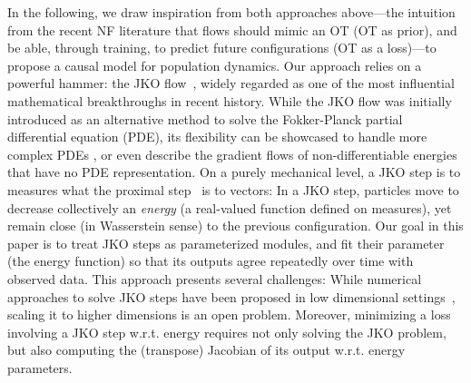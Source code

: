 In the following, we draw inspiration from both approaches above---the intuition from the recent \acrfull{NF} literature that flows should mimic an \acrlong{OT} (\acrshort{OT} as prior), and be able, through training, to predict future configurations (\acrshort{OT} as a loss)---to propose a causal model for population dynamics. Our approach relies on a powerful hammer: the \acrfull{JKO} flow~\citep{jordan1998variational}, widely regarded as one of the most influential mathematical breakthroughs in recent history. While the \acrshort{JKO} flow was initially introduced as an alternative method to solve the Fokker-Planck partial differential equation (PDE), its flexibility can be showcased to handle more complex PDEs \citep[\S4.7]{santambrogio2017euclidean}, or even describe the gradient flows of non-differentiable energies that have no PDE representation.
On a purely mechanical level, a \acrshort{JKO} step is to measures what the proximal step~\citep{combettes2011proximal} is to vectors: In a \acrshort{JKO} step, particles move to decrease collectively an {\em energy} (a real-valued function defined on measures), yet remain close (in Wasserstein sense) to the previous configuration. Our goal in this paper is to treat \acrshort{JKO} steps as parameterized modules, and fit their parameter (the energy function) so that its outputs agree repeatedly over time with observed data. 
This approach presents several challenges: While numerical approaches to solve \acrshort{JKO} steps have been proposed in low dimensional settings~\citep{burger2010a, carrillo2021primal, peyre2015entropic,benamou2016augmented}, scaling it to higher dimensions is an open problem. Moreover, minimizing a loss involving a \acrshort{JKO} step w.r.t. energy requires not only solving the \acrshort{JKO} problem, but also computing the (transpose) Jacobian of its output w.r.t. energy parameters. \\


